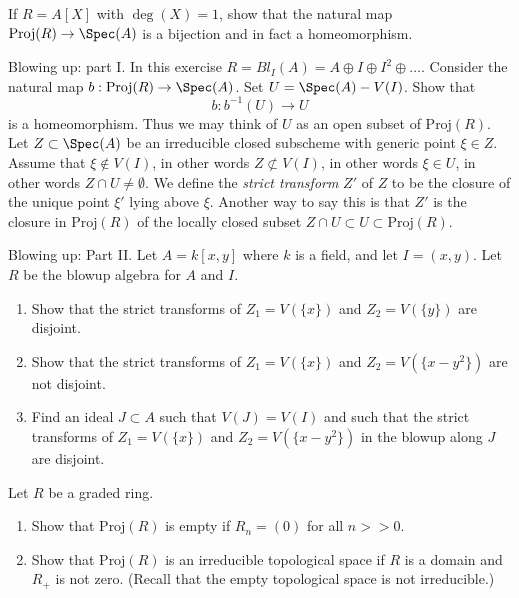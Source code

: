 \begin{exercise}
\label{exercise-iso-polynomial-ring-one-variable}
If $R = A[X]$ with $\deg(X) = 1$, show that the natural map
$\text{Proj}(R) \to \Spec(A)$ is a bijection and in fact
a homeomorphism.
\end{exercise}

\begin{exercise}
\label{exercise-blowing-up-I}
Blowing up: part I.
In this exercise $R = Bl_I(A) = A \oplus I \oplus I^2 \oplus \ldots$.
Consider the natural map $b : \text{Proj}(R) \to \Spec(A)$.
Set $U = \Spec(A) - V(I)$. Show that
$$
b : b^{-1}(U) \longrightarrow U
$$
is a homeomorphism.
Thus we may think of $U$ as an open subset of $\text{Proj}(R)$.
Let $Z \subset \Spec(A)$ be an irreducible closed subscheme
with generic point $\xi \in Z$. Assume that $\xi \not\in V(I)$,
in other words $Z \not\subset V(I)$, in other words
$\xi \in U$, in other words $Z\cap U \not = \emptyset$. We define
the {\it strict transform} $Z'$ of $Z$ to be the closure of the unique
point $\xi'$ lying above $\xi$. Another way to say this is that
$Z'$ is the closure in $\text{Proj}(R)$ of the locally closed subset
$Z\cap U \subset U \subset \text{Proj}(R)$.
\end{exercise}

\begin{exercise}
\label{exercise-blowing-up-II}
Blowing up: Part II.
Let $A = k[x, y]$ where $k$ is a field, and let $I = (x, y)$.
Let $R$ be the blowup algebra for $A$ and $I$.
\begin{enumerate}
\item Show that the strict transforms of $Z_1 = V(\{x\})$ and
$Z_2 = V(\{y\})$ are disjoint.
\item Show that the strict transforms of $Z_1 = V(\{x\})$ and
$Z_2 = V(\{x-y^2\})$ are not disjoint.
\item Find an ideal $J \subset A$ such that $V(J) = V(I)$
and such that the strict transforms of $Z_1 = V(\{x\})$ and
$Z_2 = V(\{x-y^2\})$ in the blowup along $J$ are disjoint.
\end{enumerate}
\end{exercise}

\begin{exercise}
\label{exercise-proj-when-empty}
Let $R$ be a graded ring.
\begin{enumerate}
\item Show that $\text{Proj}(R)$ is empty if $R_n = (0)$ for all $n >> 0$.
\item Show that $\text{Proj}(R)$ is an irreducible topological space
if $R$ is a domain and $R_{+}$ is not zero. (Recall that the empty
topological space is not irreducible.)
\end{enumerate}
\end{exercise}

